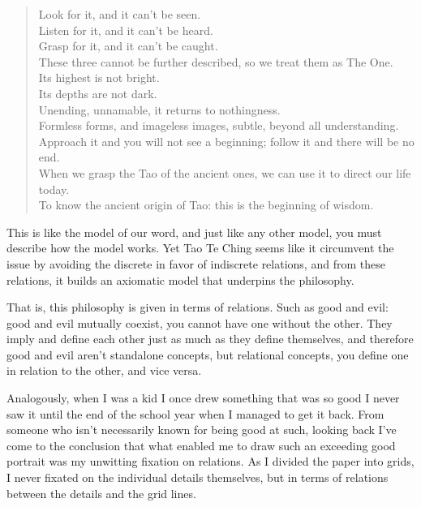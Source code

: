 \begin{verse}
Look for it, and it can't be seen.\\
Listen for it, and it can't be heard.\\
Grasp for it, and it can't be caught.\\
These three cannot be further described, so we treat them as The One.\\

Its highest is not bright.\\
Its depths are not dark.\\

Unending, unnamable, it returns to nothingness.\\
Formless forms, and imageless images, subtle, beyond all understanding.\\

Approach it and you will not see a beginning; follow it and there will be no end.\\
When we grasp the Tao of the ancient ones, we can use it to direct our life today.\\

To know the ancient origin of Tao: this is the beginning of wisdom.\\
\end{verse}

This is like the model of our word, and just like any other model, you must describe how the model works. Yet Tao Te Ching seems like it circumvent the issue by avoiding the discrete in favor of indiscrete relations, and from these relations, it builds an axiomatic model that underpins the philosophy.

That is, this philosophy is given in terms of relations. Such as good and evil: good and evil mutually coexist, you cannot have one without the other. They imply and define each other just as much as they define themselves, and therefore good and evil aren’t standalone concepts, but relational concepts, you define one in relation to the other, and vice versa. 

Analogously, when I was a kid I once drew something that was so good I never saw it until the end of the school year when I managed to get it back. From someone who isn’t necessarily known for being good at such, looking back I’ve come to the conclusion that what enabled me to draw such an exceeding good portrait was my unwitting fixation on relations. As I divided the paper into grids, I never fixated on the individual details themselves, but in terms of relations between the details and the grid lines.

